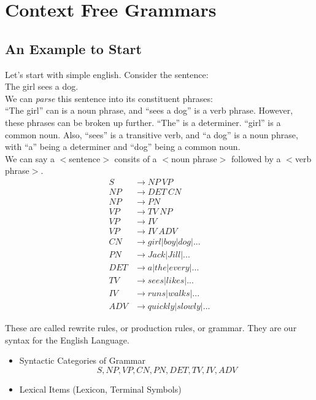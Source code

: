 \documentclass{scrartcl}
\begin{document}
\section{Context Free Grammars}
\subsection{An Example to Start}
Let's start with simple english. Consider the sentence:\\

The girl sees a dog.\\

We can \emph{parse} this sentence into its constituent phrases:\\
``The girl'' can is a noun phrase, and ``sees a dog'' is a verb phrase. However, these phrases can be broken up further. ``The'' is a determiner. ``girl'' is a common noun. Also, ``sees'' is a transitive verb, and ``a dog'' is a noun phrase, with ``a'' being a determiner and ``dog'' being a common noun.\\

We can say a $<$sentence$>$ consits of a $<$noun phrase$>$ followed by a $<$verb phrase$>$.\\
\begin{align*}
S   &\rightarrow NP\ VP\\
NP  &\rightarrow DET\ CN\\
NP  &\rightarrow PN\\
VP  &\rightarrow TV\ NP\\
VP  &\rightarrow IV\\
VP  &\rightarrow IV\ ADV\\
CN  &\rightarrow girl|boy|dog|...\\
PN  &\rightarrow Jack|Jill|...\\
DET &\rightarrow a|the|every|...\\
TV  &\rightarrow sees|likes|...\\
IV  &\rightarrow runs|walks|...\\
ADV &\rightarrow quickly|slowly|...
\end{align*}

These are called rewrite rules, or production rules, or grammar. They are our syntax for the English Language.
\begin{itemize}
\item Syntactic Categories of Grammar $$S,NP,VP,CN,PN,DET,TV,IV,ADV$$
\item Lexical Items (Lexicon, Terminal Symbols)
\end{itemize}
\end{document}
